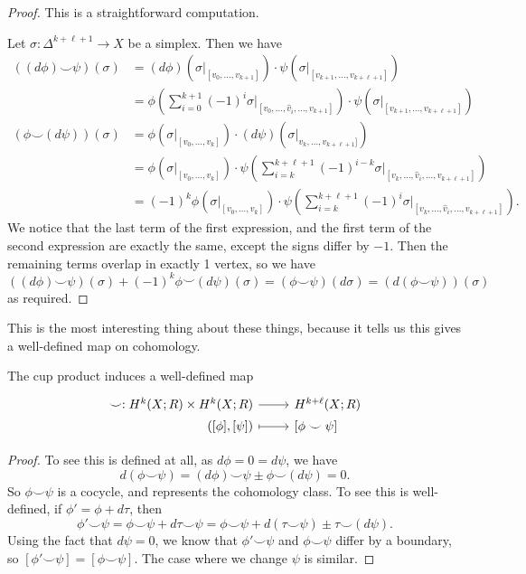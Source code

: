 \documentclass[a4paper]{article}
\theoremstyle{definition}
\begin{document}
\begin{proof}
  This is a straightforward computation.

  Let $\sigma: \Delta^{k + \ell + 1} \to X$ be a simplex. Then we have
  \begin{align*}
    ((d \phi)\smile \psi)(\sigma) &= (d \phi)(\sigma|_{[v_0, \ldots, v_{k + 1}]}) \cdot \psi(\sigma|_{[v_{k + 1}, \ldots, v_{k + \ell + 1}]})\\
    &= \phi\left(\sum_{i = 0}^{k + 1} (-1)^i \sigma|_{[v_0, \ldots, \hat{v}_i, \ldots, v_{k + 1}]}\right) \cdot \psi(\sigma|_{[v_{k + 1}, \ldots, v_{k + \ell + 1}]})\\
    (\phi \smile (d \psi))(\sigma) &= \phi(\sigma|_{[v_0, \ldots, v_k]}) \cdot (d \psi)(\sigma|_{v_k,\ldots, v_{k + \ell + 1}]})\\
    &=\phi(\sigma|_{[v_0, \ldots, v_k]}) \cdot \psi\left(\sum_{i = k}^{k + \ell + 1} (-1)^{i - k} \sigma|_{[v_k, \ldots, \hat{v}_i, \ldots, v_{k + \ell + 1}]}\right)\\
    &=(-1)^k \phi(\sigma|_{[v_0, \ldots, v_k]}) \cdot \psi\left(\sum_{i = k}^{k + \ell + 1} (-1)^{i} \sigma|_{[v_k, \ldots, \hat{v}_i, \ldots, v_{k + \ell + 1}]}\right).
  \end{align*}
  We notice that the last term of the first expression, and the first term of the second expression are exactly the same, except the signs differ by $-1$. Then the remaining terms overlap in exactly 1 vertex, so we have
  \[
    ((d \phi) \smile \psi)(\sigma) + (-1)^k \phi \smile (d \psi)(\sigma) = (\phi \smile \psi)(d \sigma) = (d (\phi \smile \psi))(\sigma)
  \]
  as required.
\end{proof}
This is the most interesting thing about these things, because it tells us this gives a well-defined map on cohomology.

\begin{cor}
  The cup product induces a well-defined map
  \[
    \begin{tikzcd}[row sep = 0ex
        ,/tikz/column 1/.append style={anchor=base east}
        ,/tikz/column 2/.append style={anchor=base west}
      ]
      \smile: H^k(X; R) \times H^k(X; R) \ar[r] & H^{k + \ell}(X; R)\\
      ([\phi], [\psi] ) \ar[r, maps to] & \lbrack\phi \smile \psi\rbrack
    \end{tikzcd}
  \]
\end{cor}

\begin{proof}
  To see this is defined at all, as $d \phi = 0 = d \psi$, we have
  \[
    d (\phi \smile \psi) = (d \phi) \smile \psi \pm \phi \smile (d \psi) = 0.
  \]
  So $\phi \smile \psi$ is a cocycle, and represents the cohomology class. To see this is well-defined, if $\phi' = \phi + d\tau$, then
  \[
    \phi' \smile \psi = \phi \smile \psi + d \tau \smile \psi = \phi \smile \psi + d(\tau \smile \psi) \pm \tau \smile (d \psi).
  \]
  Using the fact that $d \psi = 0$, we know that $\phi' \smile \psi$ and $\phi \smile \psi$ differ by a boundary, so $[\phi' \smile \psi] = [\phi \smile \psi]$. The case where we change $\psi$ is similar.
\end{proof}
\end{document}
